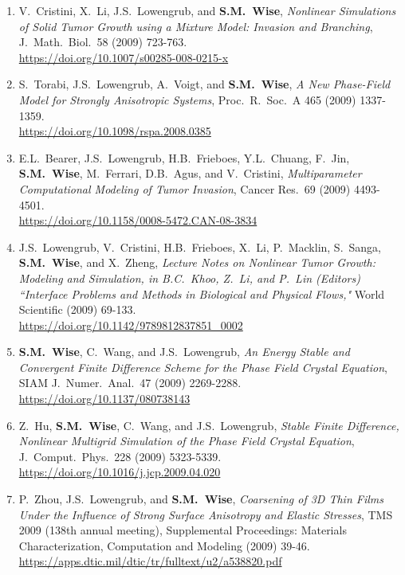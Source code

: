 \documentclass[11pt]{letter}
\begin{document}
\begin{enumerate}
	\item
V.~Cristini, X.~Li, J.S.~Lowengrub, and \textbf{S.M.~Wise}, {\sl Nonlinear Simulations of Solid Tumor Growth using a Mixture Model: Invasion and Branching}, J.~Math.~Biol.~58 (2009) 723-763.
	\\
\url{https://doi.org/10.1007/s00285-008-0215-x}

	\item
S.~Torabi, J.S.~Lowengrub, A.~Voigt, and \textbf{S.M.~Wise}, {\sl A New Phase-Field Model for Strongly Anisotropic Systems}, Proc.~R.~Soc.~A 465 (2009) 1337-1359.
	\\
\url{https://doi.org/10.1098/rspa.2008.0385}


	\item
E.L.~Bearer, J.S.~Lowengrub, H.B.~Frieboes, Y.L.~Chuang, F.~Jin, \textbf{S.M.~Wise}, M.~Ferrari, D.B.~Agus, and V.~Cristini, {\sl Multiparameter Computational Modeling of Tumor Invasion}, Cancer Res.~69 (2009) 4493-4501.
	\\
\url{https://doi.org/10.1158/0008-5472.CAN-08-3834}

	\item
J.S.~Lowengrub, V.~Cristini, H.B.~Frieboes, X.~Li, P.~Macklin, S.~Sanga, \textbf{S.M.~Wise}, and X.~Zheng, {\sl Lecture Notes on Nonlinear Tumor Growth: Modeling and Simulation, in  B.C.~Khoo, Z.~Li, and P.~Lin (Editors) ``Interface Problems and Methods in Biological and Physical Flows,"} World Scientific (2009) 69-133.
	\\
\url{https://doi.org/10.1142/9789812837851_0002}

	\item
\textbf{S.M.~Wise}, C.~Wang, and J.S.~Lowengrub, {\sl An Energy Stable and Convergent Finite Difference Scheme for the Phase Field Crystal Equation}, SIAM J.~Numer.~Anal.~47 (2009) 2269-2288.
	\\
\url{https://doi.org/10.1137/080738143}

	\item
Z.~Hu, \textbf{S.M.~Wise}, C.~Wang, and J.S.~Lowengrub, {\sl Stable Finite Difference, Nonlinear Multigrid Simulation of the Phase Field Crystal Equation}, J.~Comput.~Phys.~228 (2009) 5323-5339.
	\\
\url{https://doi.org/10.1016/j.jcp.2009.04.020}

	\item
P.~Zhou, J.S.~Lowengrub, and \textbf{S.M.~Wise}, {\sl Coarsening of 3D Thin Films Under the Influence of Strong Surface Anisotropy and Elastic Stresses}, TMS 2009 (138th annual meeting), Supplemental Proceedings: Materials Characterization, Computation and Modeling (2009) 39-46.
	\\
\url{https://apps.dtic.mil/dtic/tr/fulltext/u2/a538820.pdf}


\end{enumerate}
\end{document}
